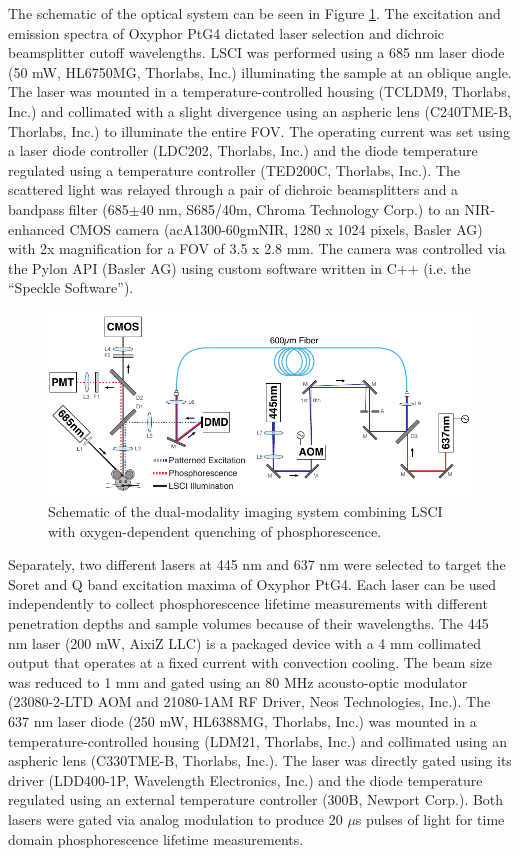 The schematic of the optical system can be seen in Figure \ref{fig:systemschematic_1}. The excitation and emission spectra of Oxyphor PtG4 dictated laser selection and dichroic beamsplitter cutoff wavelengths. LSCI was performed using a 685 nm laser diode (50 mW, HL6750MG, Thorlabs, Inc.) illuminating the sample at an oblique angle. The laser was mounted in a temperature-controlled housing (TCLDM9, Thorlabs, Inc.) and collimated with a slight divergence using an aspheric lens (C240TME-B, Thorlabs, Inc.) to illuminate the entire FOV. The operating current was set using a laser diode controller (LDC202, Thorlabs, Inc.) and the diode temperature regulated using a temperature controller (TED200C, Thorlabs, Inc.). The scattered light was relayed through a pair of dichroic beamsplitters and a bandpass filter (685$\pm$40 nm, S685/40m, Chroma Technology Corp.) to an NIR-enhanced CMOS camera (acA1300-60gmNIR, 1280 x 1024 pixels, Basler AG) with 2x magnification for a FOV of 3.5 x 2.8 mm. The camera was controlled via the Pylon API (Basler AG) using custom software written in C++ (i.e. the ``Speckle Software'').

\begin{figure}
    \includegraphics{figures/chapter_2/systemschematic.pdf}
    \caption{
        \label{fig:systemschematic_1}
        Schematic of the dual-modality imaging system combining LSCI with oxygen-dependent quenching of phosphorescence.
    }
\end{figure}

Separately, two different lasers at 445 nm and 637 nm were selected to target the Soret and Q band excitation maxima of Oxyphor PtG4. Each laser can be used independently to collect phosphorescence lifetime measurements with different penetration depths and sample volumes because of their wavelengths. The 445 nm laser (200 mW, AixiZ LLC) is a packaged device with a 4 mm collimated output that operates at a fixed current with convection cooling. The beam size was reduced to 1 mm and gated using an 80 MHz acousto-optic modulator (23080-2-LTD AOM and 21080-1AM RF Driver, Neos Technologies, Inc.). The 637 nm laser diode (250 mW, HL6388MG, Thorlabs, Inc.) was mounted in a temperature-controlled housing (LDM21, Thorlabs, Inc.) and collimated using an aspheric lens (C330TME-B, Thorlabs, Inc.). The laser was directly gated using its driver (LDD400-1P, Wavelength Electronics, Inc.) and the diode temperature regulated using an external temperature controller (300B, Newport Corp.). Both lasers were gated via analog modulation to produce 20 $\mu$s pulses of light for time domain phosphorescence lifetime measurements.

